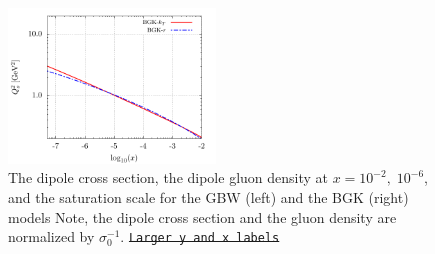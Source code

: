\documentclass[11pt]{article}
\numberwithin{equation}{section}
\numberwithin{table}{section}
\numberwithin{figure}{section}
\newcommand{\comment}[1]{\texttt{\color{red}#1}}
\begin{document}
\begin{figure}[p]
\begin{multicols}{2}
    \includegraphics[width=0.49\textwidth]{./plots/BGK-saturation.pdf}
  \end{multicols}
  \caption{The dipole cross section, the dipole gluon density at $x=10^{-2},\;
  10^{-6}$, and the saturation scale for the GBW (left) and the BGK (right)
  models Note, the dipole cross section and the gluon density are normalized by
  $\sigma_0^{-1}$. \sout{\comment{Larger y and x labels}}} 
\end{figure}
\end{document}
